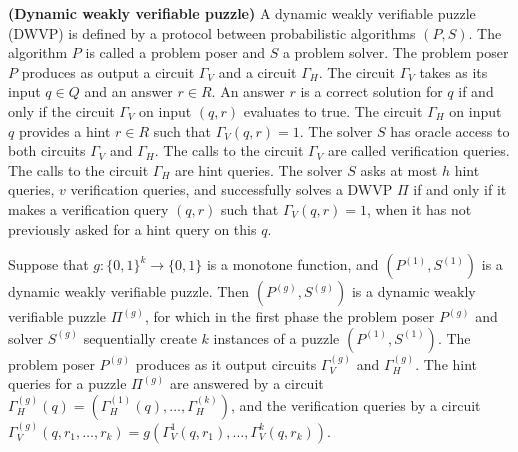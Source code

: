 \begin{definition} {\textbf{(Dynamic weakly verifiable puzzle)}}
  A dynamic weakly verifiable puzzle (DWVP) is defined by a protocol between probabilistic algorithms $(P,S)$.
  The algorithm $P$ is called a problem poser and $S$ a problem solver.
  The problem poser $P$ produces as output a circuit $\Gamma_{V}$ and a circuit $\Gamma_{H}$.
  The circuit $\Gamma_{V}$ takes as its input $q \in Q$ and an answer $r \in R$.
  An answer $r$ is a correct solution for $q$ if and only if the circuit $\Gamma_V$ on input $(q,r)$ evaluates to true.
  The circuit $\Gamma_H$ on input $q$ provides a hint $r \in R$ such that $\Gamma_V(q,r) = 1$.
  The solver $S$ has oracle access to both circuits $\Gamma_V$ and $\Gamma_H$.
  The calls to the circuit $\Gamma_V$ are called verification queries. The calls to the circuit $\Gamma_H$ are hint queries.
  The solver $S$ asks at most $h$ hint queries, $v$ verification queries, and successfully solves a DWVP $\Pi$ if and only if
  it makes a verification query $(q,r)$ such that $\Gamma_V(q,r) = 1$, when it has not previously asked for a hint query on this $q$.
\end{definition}
%
%
Suppose that $g: \{0,1\}^k \rightarrow \{0,1\}$ is a monotone function, and $\left( P^{(1)}, S^{(1)} \right)$ is a dynamic weakly verifiable puzzle.
Then $(P^{(g)}, S^{(g)})$ is a dynamic weakly verifiable puzzle $\Pi^{(g)}$, for which in the first phase the problem poser $P^{(g)}$ and solver $S^{(g)}$
sequentially create $k$ instances of a puzzle $\left( P^{(1)}, S^{(1)}\right)$. The problem poser $P^{(g)}$ produces as it output circuits $\Gamma_V^{(g)}$ and $\Gamma_H^{(g)}$.
The hint queries for a puzzle $\Pi^{(g)}$ are answered by a circuit $\Gamma_H^{(g)}(q) = \left( \Gamma_H^{(1)}(q), \dots, \Gamma_H^{(k)} \right)$, and the verification queries by a circuit $\Gamma_V^{(g)}(q, r_1, \dots, r_k) = g \left( \Gamma_V^{1}(q, r_1), \dots, \Gamma_V^{k}(q, r_k) \right)$.

